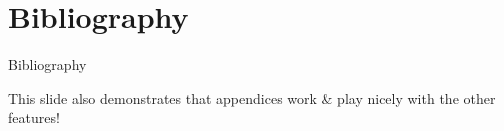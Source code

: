 \documentclass[10pt]{beamer}
\begin{document}
\appendix
{}
\section{Bibliography}

\begin{frame}{Bibliography}

    \nocite{*}
    \printbibliography[heading=none]
    
    This slide also demonstrates that appendices work \& play nicely with the other features!
\end{frame}

\begin{frame}
\urLogoW[height=2.5cm]
\end{frame}
\end{document}
